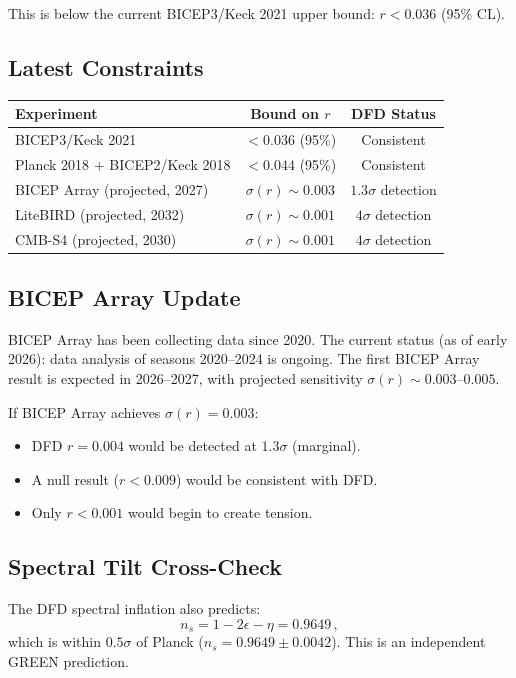 \documentclass[11pt,a4paper]{article}
\begin{document}
This is below the current BICEP3/Keck 2021 upper bound: $r < 0.036$ (95\% CL).

\subsection{Latest Constraints}

\begin{center}
\begin{tabular}{lcc}
\toprule
\textbf{Experiment} & \textbf{Bound on $r$} & \textbf{DFD Status} \\
\midrule
BICEP3/Keck 2021 & $< 0.036$ (95\%) & Consistent \\
Planck 2018 + BICEP2/Keck 2018 & $< 0.044$ (95\%) & Consistent \\
BICEP Array (projected, 2027) & $\sigma(r) \sim 0.003$ & $1.3\sigma$ detection \\
LiteBIRD (projected, 2032) & $\sigma(r) \sim 0.001$ & $4\sigma$ detection \\
CMB-S4 (projected, 2030) & $\sigma(r) \sim 0.001$ & $4\sigma$ detection \\
\bottomrule
\end{tabular}
\end{center}

\subsection{BICEP Array Update}

BICEP Array has been collecting data since 2020. The current status (as of early 2026): data analysis of seasons 2020--2024 is ongoing. The first BICEP Array result is expected in 2026--2027, with projected sensitivity $\sigma(r) \sim 0.003$--$0.005$.

If BICEP Array achieves $\sigma(r) = 0.003$:
\begin{itemize}
\item DFD $r = 0.004$ would be detected at $1.3\sigma$ (marginal).
\item A null result ($r < 0.009$) would be consistent with DFD.
\item Only $r < 0.001$ would begin to create tension.
\end{itemize}

\subsection{Spectral Tilt Cross-Check}

The DFD spectral inflation also predicts:
\begin{equation}
n_s = 1 - 2\epsilon - \eta = 0.9649\,,
\end{equation}
which is within $0.5\sigma$ of Planck ($n_s = 0.9649 \pm 0.0042$). This is an independent GREEN prediction.
\end{document}
